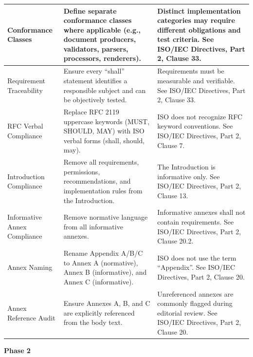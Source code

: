 \documentclass[11pt,a4paper]{article}
\begin{document}
\begin{table}[h]
\begin{tabular}{|l|l|l|}
Conformance Classes & Define separate conformance classes where applicable (e.g., document producers, validators, parsers, processors, renderers). & Distinct implementation categories may require different obligations and test criteria. See ISO/IEC Directives, Part 2, Clause 33. \\ \hline
Requirement Traceability & Ensure every “shall” statement identifies a responsible subject and can be objectively tested. & Requirements must be measurable and verifiable. See ISO/IEC Directives, Part 2, Clause 33. \\ \hline
RFC Verbal Compliance & Replace RFC 2119 uppercase keywords (MUST, SHOULD, MAY) with ISO verbal forms (shall, should, may). & ISO does not recognize RFC keyword conventions. See ISO/IEC Directives, Part 2, Clause 7. \\ \hline
Introduction Compliance & Remove all requirements, permissions, recommendations, and implementation rules from the Introduction. & The Introduction is informative only. See ISO/IEC Directives, Part 2, Clause 13. \\ \hline
Informative Annex Compliance & Remove normative language from all informative annexes. & Informative annexes shall not contain requirements. See ISO/IEC Directives, Part 2, Clause 20.2. \\ \hline
Annex Naming & Rename Appendix A/B/C to Annex A (normative), Annex B (informative), and Annex C (informative). & ISO does not use the term “Appendix”. See ISO/IEC Directives, Part 2, Clause 20. \\ \hline
Annex Reference Audit & Ensure Annexes A, B, and C are explicitly referenced from the body text. & Unreferenced annexes are commonly flagged during editorial review. See ISO/IEC Directives, Part 2, Clause 20. \\ \hline
\end{tabular}
\end{table}

\textbf{Phase 2}
\end{document}
